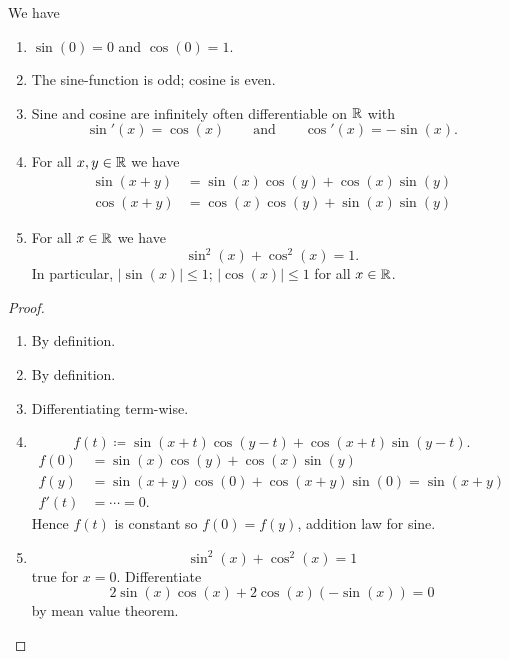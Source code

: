 \begin{theorem}\label{thm:def_pow_series_sin_cos}
    We have
    \begin{enumerate}[label = (\roman*)]
        \item $\sin(0) = 0$ and $\cos(0) = 1$.

        \item The sine-function is odd;
        cosine is even.

        \item Sine and cosine are infinitely often differentiable on $\mathbb{R}$ with
        \[
        \sin'(x) = \cos(x)\qquad\text{and}\qquad\cos'(x) = -\sin(x).
        \]

        \item For all $x, y \in \mathbb{R}$ we have
        \begin{align*}
            \sin(x + y) &= \sin(x)\cos(y) + \cos(x)\sin(y) \\
            \cos(x + y) &= \cos(x)\cos(y) + \sin(x)\sin(y)
        \end{align*}

        \item For all $x \in \mathbb{R}$ we have
        \[
        \sin ^ 2(x) + \cos ^ 2(x) = 1.
        \]
        In particular,
        $|\sin(x)| \leq 1$;
        $|\cos(x)| \leq 1$ for all $x \in \mathbb{R}$.
    \end{enumerate}
\end{theorem}
\begin{proof}\phantom{}
    \begin{enumerate}[label = (\roman*)]
        \item By definition.
        
        \item By definition.

        \item Differentiating term-wise.

        \item
        \[
        f(t) \coloneqq \sin(x + t)\cos(y - t) + \cos(x + t)\sin(y - t).
        \]
        \begin{align*}
            f(0) &= \sin(x)\cos(y) + \cos(x)\sin(y) \\
            f(y) &= \sin(x + y)\cos(0) + \cos(x + y)\sin(0) = \sin(x + y) \\
            f'(t) &= \dotsi = 0.
        \end{align*}
        Hence $f(t)$ is constant so $f(0) = f(y)$,
        addition law for sine.

        \item
        \[
        \sin ^ 2(x) + \cos ^ 2(x) = 1
        \]
        true for $x = 0$.
        Differentiate
        \[
        2\sin(x)\cos(x) + 2\cos(x)(-\sin(x)) = 0
        \]
        by mean value theorem.
    \end{enumerate}
\end{proof}

